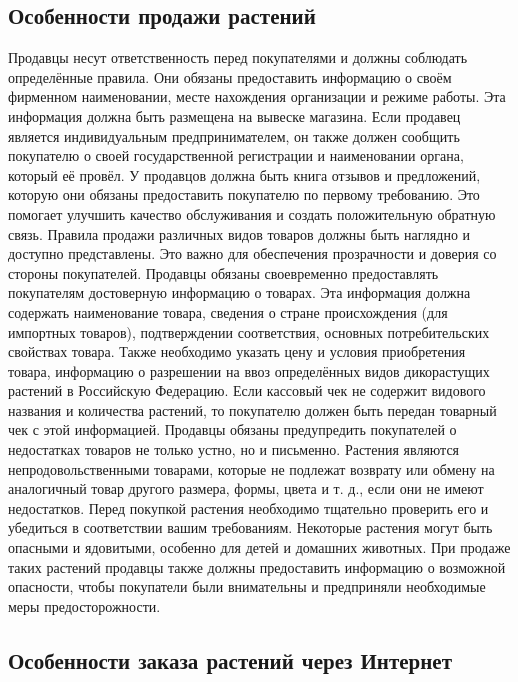 \subsection{Особенности продажи растений}
Продавцы несут ответственность перед покупателями и должны соблюдать определённые правила. Они обязаны предоставить информацию о своём фирменном наименовании, месте нахождения организации и режиме работы. Эта информация должна быть размещена на вывеске магазина.
Если продавец является индивидуальным предпринимателем, он также должен сообщить покупателю о своей государственной регистрации и наименовании органа, который её провёл.
У продавцов должна быть книга отзывов и предложений, которую они обязаны предоставить покупателю по первому требованию. Это помогает улучшить качество обслуживания и создать положительную обратную связь.
Правила продажи различных видов товаров должны быть наглядно и доступно представлены. Это важно для обеспечения прозрачности и доверия со стороны покупателей.
Продавцы обязаны своевременно предоставлять покупателям достоверную информацию о товарах. Эта информация должна содержать наименование товара, сведения о стране происхождения (для импортных товаров), подтверждении соответствия, основных потребительских свойствах товара. Также необходимо указать цену и условия приобретения товара, информацию о разрешении на ввоз определённых видов дикорастущих растений в Российскую Федерацию.
Если кассовый чек не содержит видового названия и количества растений, то покупателю должен быть передан товарный чек с этой информацией.
Продавцы обязаны предупредить покупателей о недостатках товаров не только устно, но и письменно.
Растения являются непродовольственными товарами, которые не подлежат возврату или обмену на аналогичный товар другого размера, формы, цвета и т. д., если они не имеют недостатков. Перед покупкой растения необходимо тщательно проверить его и убедиться в соответствии вашим требованиям. 
Некоторые растения могут быть опасными и ядовитыми, особенно для детей и домашних животных. При продаже таких растений продавцы также должны предоставить информацию о возможной опасности, чтобы покупатели были внимательны и предприняли необходимые меры предосторожности.


\subsection{Особенности заказа растений через Интернет}

